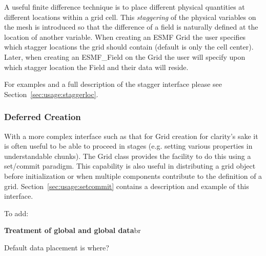  A useful finite difference technique is to place different physical quantities at different locations within a grid cell. This {\em {staggering}} of the physical variables on the mesh is introduced so that the difference of a field is naturally defined at the location of another variable. When creating an 
ESMF Grid the user specifies which stagger locations the grid should 
contain (default is only the cell center). Later, when creating an  ESMF\_Field
on the Grid the user will specify upon which stagger location the Field
and their data will reside.
 
For examples and a full description of the stagger interface 
please see Section~\ref{sec:usage:staggerloc}. 

\subsubsection{Deferred Creation}

 With a more complex interface such as that for Grid creation
for clarity's sake it is often useful to be able to proceed in stages
(e.g. setting various properties in understandable chunks). The 
Grid class provides the facility to do this using a set/commit paradigm.
This capability is also useful in distributing a grid object before
initialization or when multiple components contribute to the 
definition of a grid. Section~\ref{sec:usage:setcommit}
contains a description and example of this interface. 


To add:

{\bf Treatment of global and global data}{br}
 
Default data placement is where?


